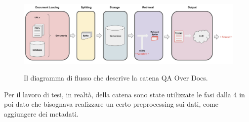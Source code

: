 \begin{center}
    \begin{figure}[H]
        \includegraphics[height=0.18\pdfpageheight, width=0.8\pdfpagewidth]{images/QAchain.jpeg}\label{fig:qaoverdocs}
        \caption[QA Over Docs]{Il diagramma di flusso che descrive la catena QA Over Docs.}
    \end{figure}
\end{center}

Per il lavoro di tesi, in realtà, della catena sono state utilizzate le fasi dalla 4 in poi dato che bisognava realizzare un certo preprocessing sui dati, come aggiungere dei metadati.